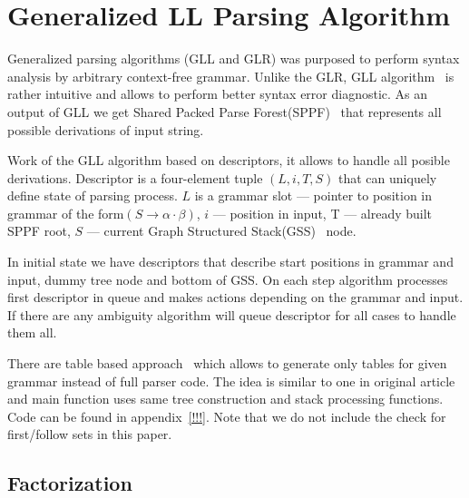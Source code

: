\documentclass[runningheads,a4paper]{llncs}
\begin{document}



\section{Generalized LL Parsing Algorithm}%

Generalized parsing algorithms (GLL and GLR) was purposed to perform syntax analysis by arbitrary context-free 
grammar. Unlike the GLR, GLL algorithm~\cite{scott2010gll} is rather intuitive and allows to perform better syntax error diagnostic.
As an output of GLL we get Shared Packed Parse Forest(SPPF)~\cite{scott2013gll} that represents all possible derivations of input string.

Work of the GLL algorithm based on descriptors, it allows to handle all posible derivations.
Descriptor is a four-element tuple $(L,i, T, S)$ that can uniquely define state of parsing process. 
$L$ is a grammar slot --- pointer to position in grammar of the form$(S \to \alpha \cdot \beta)$, $i$ --- position in input,
T --- already built SPPF root, $S$ --- current Graph Structured Stack(GSS)~\cite{GSS} node.

In initial state we have descriptors that describe start positions in grammar and input, dummy tree node and bottom of GSS.
On each step algorithm processes first descriptor in queue and makes actions depending on the grammar and input.
If there are any ambiguity algorithm will queue descriptor for all cases to handle them all. 

There are table based approach~\cite{ragozina} which allows to generate only tables for given grammar instead of full parser code.
The idea is similar to one in original article and main function uses same tree construction and stack processing functions.
Code can be found in appendix~\ref{!!!}. Note that we do not include the check for first/follow sets in this paper.

\subsection{Factorization}%
\end{document}

